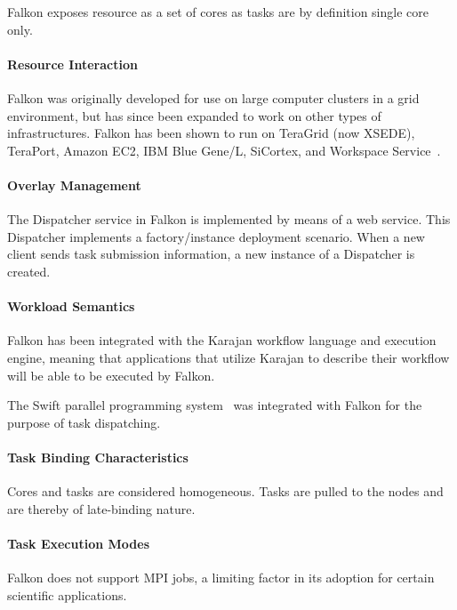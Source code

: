\documentclass{sig-alternate}
\begin{document}
Falkon exposes resource as a set of cores as tasks are by definition single
core only.

\paragraph{Resource Interaction}

Falkon was originally developed for use on large computer clusters in a grid
environment, but has since been expanded to work on other types of
infrastructures. Falkon has been shown to run on TeraGrid (now XSEDE),
TeraPort, Amazon EC2, IBM Blue Gene/L, SiCortex, and Workspace
Service~\cite{1362680}.

\paragraph{Overlay Management}

The Dispatcher service in Falkon is implemented by means of a web service.
This Dispatcher implements a factory/instance deployment scenario.
When a new client sends task submission information, a new instance
of a Dispatcher is created.

\paragraph{Workload Semantics}

Falkon has been integrated with the Karajan workflow language and execution
engine, meaning that applications that utilize Karajan to describe their
workflow will be able to be executed by Falkon.

The Swift parallel programming system~\cite{Wilde2011} was integrated
with Falkon for the purpose of task dispatching.

\paragraph{Task Binding Characteristics}

Cores and tasks are considered homogeneous. Tasks are pulled to the nodes
and are thereby of late-binding nature.

\paragraph{Task Execution Modes}

Falkon does not support MPI jobs, a limiting factor in its adoption for certain
scientific applications.
\end{document}
